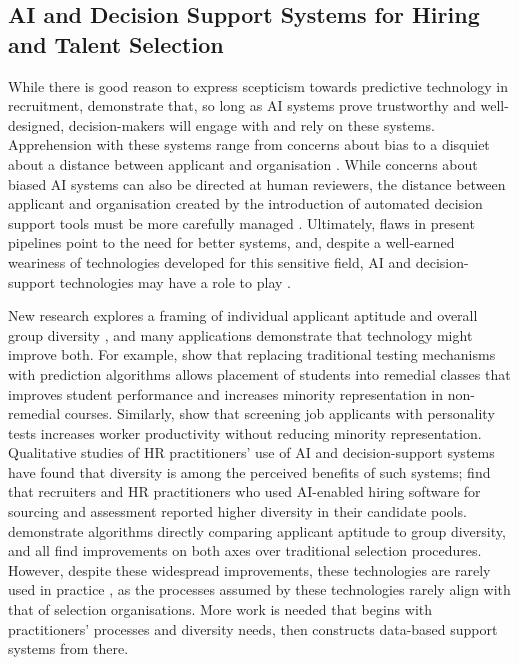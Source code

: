 \subsection{AI and Decision Support Systems for Hiring and Talent Selection}
While there is good reason to express scepticism towards predictive technology in recruitment, \textcite{Vereschak_Alizadeh_Bailly_Caramiaux_2024} demonstrate that, so long as AI systems prove trustworthy and well-designed, decision-makers will engage with and rely on these systems. Apprehension with these systems range from concerns about bias to a disquiet about a distance between applicant and organisation \cite{Lashkari_Cheng_2023}. While concerns about biased AI systems can also be directed at human reviewers, the distance between applicant and organisation created by the introduction of automated decision support tools must be more carefully managed \cite{Leung_Zhang_Jibuti_Zhao_Klein_Pierce_Robert_Zhu_2020,Lashkari_Cheng_2023}. Ultimately, flaws in present pipelines point to the need for better systems, and, despite a well-earned weariness of technologies developed for this sensitive field, AI and decision-support technologies may have a role to play \cite{kleinberg2018algorithmic,Vereschak_Alizadeh_Bailly_Caramiaux_2024,barocas2023fairness,huppenkothen2020entrofy,schumann2017diverse}.

New research explores a framing of individual applicant aptitude and overall group diversity \cite{noray2023systemic}, and many applications demonstrate that technology might improve both. For example, \textcite{bergman2021seven} show that replacing traditional testing mechanisms with prediction algorithms allows placement of students into remedial classes that improves student performance and increases minority representation in non-remedial courses. Similarly, \textcite{autor2008does} show that screening job applicants with personality tests increases worker productivity without reducing minority representation. Qualitative studies of HR practitioners' use of AI and decision-support systems have found that diversity is among the perceived benefits of such systems; \textcite{li2021algorithmic} find that recruiters and HR practitioners who used AI-enabled hiring software for sourcing and assessment reported higher diversity in their candidate pools.  \textcite{huppenkothen2020entrofy,kleinberg2018algorithmic,schumann2017diverse} demonstrate algorithms directly comparing applicant aptitude to group diversity, and all find improvements on both axes over traditional selection procedures. However, despite these widespread improvements, these technologies are rarely used in practice \cite{page_diversity_2017}, as the processes assumed by these technologies rarely align with that of selection organisations. More work is needed that begins with practitioners' processes and diversity needs, then constructs data-based support systems from there.

